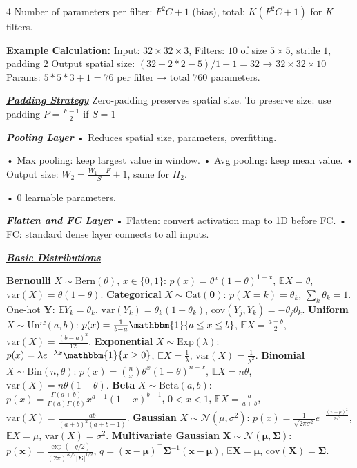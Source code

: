 \documentclass[10pt]{article}
\newcommand{\bulletPoint}[1]{\ul{\textit{\textbf{#1}}}}
\begin{document}
\begin{multicols*}{4}
Number of parameters per filter: $F^2 C + 1$ (bias), \quad total: $K(F^2C + 1)$ for $K$ filters.\quad

\textbf{Example Calculation:} 
Input: $32 \times 32 \times 3$, Filters: $10$ of size $5 \times 5$, stride $1$, padding $2$ \quad
Output spatial size: $(32+2*2-5)/1 + 1 = 32$ → $32 \times 32 \times 10$ \quad
Params: $5*5*3 + 1 = 76$ per filter → total $760$ parameters.

\bulletPoint{Padding Strategy} \quad
Zero-padding preserves spatial size. To preserve size: use padding $P = \frac{F - 1}{2}$ if $S = 1$

\bulletPoint{Pooling Layer} \quad
• Reduces spatial size, parameters, overfitting. \quad

• Max pooling: keep largest value in window. \quad
• Avg pooling: keep mean value. \quad
• Output size: $W_2 = \frac{W_1 - F}{S} + 1$, same for $H_2$. \quad 

• 0 learnable parameters.

\bulletPoint{Flatten and FC Layer} \quad
• Flatten: convert activation map to 1D before FC. \quad
• FC: standard dense layer connects to all inputs.

\bulletPoint{Basic Distributions} \quad

\textbf{Bernoulli} $X\sim\mathrm{Bern}(\theta)$, $x\in\{0,1\}$:
$p(x)=\theta^x(1-\theta)^{1-x}$,
$\mathbb{E}X=\theta$, $\mathrm{var}(X)=\theta(1-\theta)$. \quad
\textbf{Categorical} $X\sim\mathrm{Cat}(\boldsymbol{\theta})$:
$p(X=k)=\theta_k$, $\sum_k\theta_k=1$.
One-hot $\mathbf{Y}$: $\mathbb{E}Y_k=\theta_k$,
$\mathrm{var}(Y_k)=\theta_k(1-\theta_k)$,
$\mathrm{cov}(Y_j,Y_k)=-\theta_j\theta_k$. \quad
\textbf{Uniform} $X\sim\mathrm{Unif}(a,b)$:
$p(x)=\frac{1}{b-a}\mathbbm{1}\{a\le x\le b\}$,
$\mathbb{E}X=\frac{a+b}{2}$,
$\mathrm{var}(X)=\frac{(b-a)^2}{12}$. \quad
\textbf{Exponential} $X\sim\mathrm{Exp}(\lambda)$:
$p(x)=\lambda e^{-\lambda x}\mathbbm{1}\{x\ge0\}$,
$\mathbb{E}X=\frac{1}{\lambda}$,
$\mathrm{var}(X)=\frac{1}{\lambda^2}$. \quad
\textbf{Binomial} $X\sim\mathrm{Bin}(n,\theta)$:
$p(x)=\binom{n}{x}\theta^x(1-\theta)^{n-x}$,
$\mathbb{E}X=n\theta$,
$\mathrm{var}(X)=n\theta(1-\theta)$. \quad
\textbf{Beta} $X\sim\mathrm{Beta}(a,b)$:
$p(x)=\frac{\Gamma(a+b)}{\Gamma(a)\Gamma(b)}
x^{a-1}(1-x)^{b-1}$, $0<x<1$,
$\mathbb{E}X=\frac{a}{a+b}$,
$\mathrm{var}(X)=\frac{ab}{(a+b)^2(a+b+1)}$. \quad
\textbf{Gaussian} $X\sim\mathcal{N}(\mu,\sigma^2)$:
$p(x)=\frac{1}{\sqrt{2\pi\sigma^2}}
e^{-\frac{(x-\mu)^2}{2\sigma^2}}$,
$\mathbb{E}X=\mu$, $\mathrm{var}(X)=\sigma^2$. \quad
\textbf{Multivariate Gaussian} $\mathbf{X}\sim\mathcal{N}(\boldsymbol{\mu},\boldsymbol{\Sigma})$:
$p(\mathbf{x})=\frac{\exp(-q/2)}
{(2\pi)^{K/2}|\boldsymbol{\Sigma}|^{1/2}}$,
$q=(\mathbf{x}-\boldsymbol{\mu})^\top
\boldsymbol{\Sigma}^{-1}(\mathbf{x}-\boldsymbol{\mu})$,
$\mathbb{E}\mathbf{X}=\boldsymbol{\mu}$,
$\mathrm{cov}(\mathbf{X})=\boldsymbol{\Sigma}$.


\end{multicols*}
\end{document}
